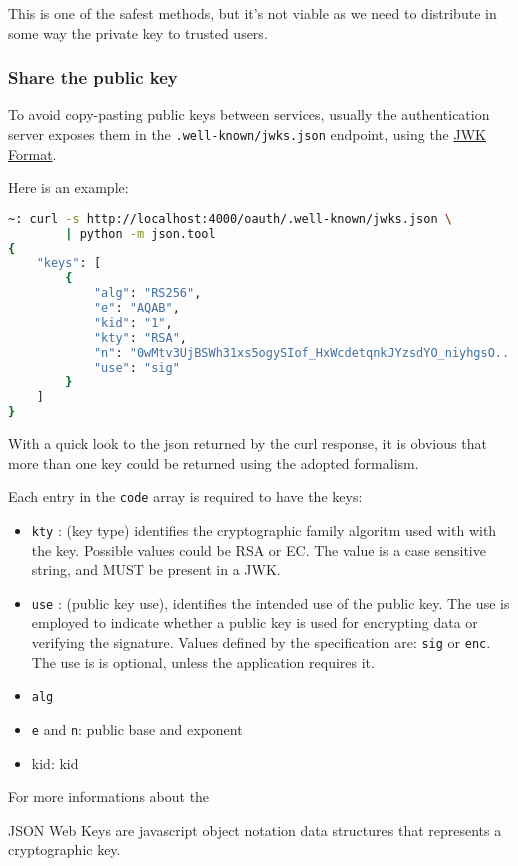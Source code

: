 This is one of the safest methods, but it's not viable as we need to distribute in some way the private key to
trusted users.

\subsubsection{Share the public key}
\label{jwks}
To avoid copy-pasting public keys between services, usually the authentication
server exposes them in the \texttt{.well-known/jwks.json} endpoint, using the
\href{https://tools.ietf.org/html/rfc7517#section-4}{JWK Format}.

Here is an example:

\begin{lstlisting}[language=bash]
~: curl -s http://localhost:4000/oauth/.well-known/jwks.json \
        | python -m json.tool
{
    "keys": [
        {
            "alg": "RS256",
            "e": "AQAB",
            "kid": "1",
            "kty": "RSA",
            "n": "0wMtv3UjBSWh31xs5ogySIof_HxWcdetqnkJYzsdYO_niyhgsO...",
            "use": "sig"
        }
    ]
}
\end{lstlisting}
With a quick look to the json returned by the curl response, it is obvious that
more than one key could be returned using the adopted formalism.

Each entry in the \texttt{code} array is required to have the keys:
\begin{itemize}
    \item \texttt{kty} : (key type) identifies the cryptographic family algoritm
        used with with the key. Possible values could be RSA or EC.
        The value is a case sensitive string, and MUST be present in a JWK.
    \item \texttt{use} : (public key use), identifies the intended use of the
        public key. The use is employed to indicate whether a public key is used
        for encrypting data or verifying the signature. Values defined by the
        specification are: \texttt{sig} or \texttt{enc}.
        The use is is optional, unless the application requires it.
    \item \texttt{alg}
    \item \texttt{e} and \texttt{n}: public base and exponent
    \item \acs{kid}: \acl{kid}
\end{itemize}

For more informations about the

JSON Web Keys are javascript object notation data structures that represents a
cryptographic key.

